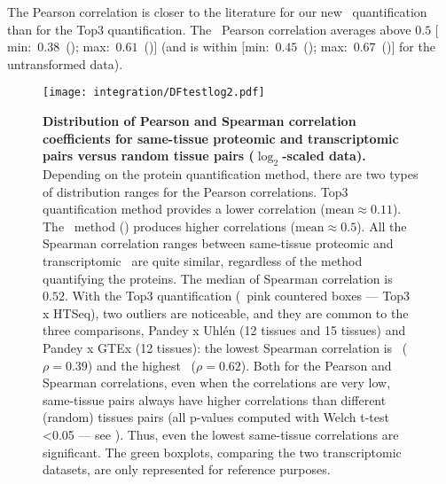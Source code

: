 The Pearson correlation is closer to the literature
for our new \PPKM\ quantification
than for the Top3 quantification.
The \PPKM\ Pearson correlation averages
above $0.5$ $[$min:~$0.38$~(\Oesophagus)\;; max:~$0.61$~(\Liver)$]$
(and is within $[$min:~$0.45$~(\Oesophagus)\;; max:~$0.67$~(\Liver)$]$
for the untransformed data).\mybr\

\begin{figure}[!htbp]
    \texttt{[image: integration/DFtestlog2.pdf]}\centering
    \vspace{-4mm}
    \caption[Distribution of Pearson and Spearman correlation coefficients
    for same-tissue proteomic and transcriptomic pairs
    versus random tissue pairs]{\label{fig:TestSig}\textbf{Distribution of
    Pearson and Spearman correlation coefficients
    for same-tissue proteomic and transcriptomic pairs versus random tissue
    pairs ($\log_2$-scaled data).} Depending on the protein quantification method,
    there are two types of distribution ranges for the Pearson correlations.
    Top3 quantification method provides a lower correlation ($\text{mean} \approx 0.11$).
    The \PPKM\ method () produces higher correlations
    ($\text{mean} \approx 0.5$).
    All the Spearman correlation ranges between same-tissue proteomic and
    transcriptomic \treps\ are quite similar,
    regardless of the method quantifying the proteins.
    The median of Spearman correlation is $0.52$.
    With the Top3 quantification (\ie\ pink countered boxes --- Top3 x HTSeq),
    two outliers are noticeable, and they are common to the three comparisons,
    Pandey x Uhlén (12 tissues and 15 tissues) and Pandey x GTEx (12 tissues):
    the lowest Spearman correlation is \Oesophagus\ ($\rho=0.39$)
    and the highest \liver\ ($\rho=0.62$).
    Both for the Pearson and Spearman correlations,
    even when the correlations are very low,
    same-tissue pairs always have higher correlations than
    different (random) tissues pairs
    (all p-values computed with Welch t-test <0.05 --- see ).
    Thus, even the lowest same-tissue correlations are significant.
    The green boxplots, comparing the two transcriptomic datasets,
    are only represented for reference purposes.}
\end{figure}

